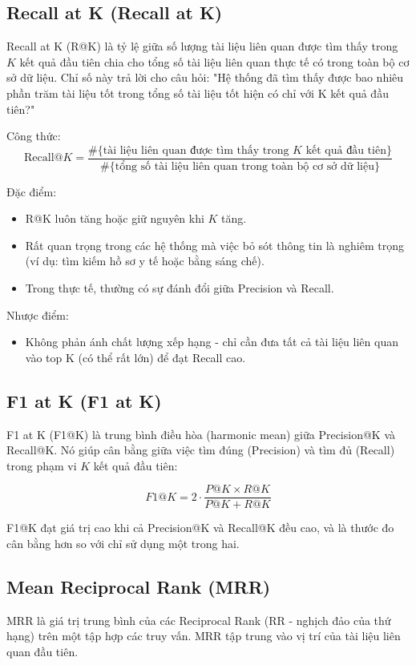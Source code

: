 \documentclass[../BTL.tex]{subfiles}
\begin{document}
\subsection{Recall at K (Recall at K)}
Recall at K (R@K) là tỷ lệ giữa số lượng tài liệu liên quan được tìm thấy trong $K$ kết quả đầu tiên chia cho tổng số tài liệu liên quan thực tế có trong toàn bộ cơ sở dữ liệu. Chỉ số này trả lời cho câu hỏi: "Hệ thống đã tìm thấy được bao nhiêu phần trăm tài liệu tốt trong tổng số tài liệu tốt hiện có chỉ với K kết quả đầu tiên?"

Công thức:
$$
\text{Recall}@K = \frac{\#\{\text{tài liệu liên quan được tìm thấy trong } K \text{ kết quả đầu tiên}\}}{\#\{\text{tổng số tài liệu liên quan trong toàn bộ cơ sở dữ liệu}\}}
$$

Đặc điểm:
\begin{itemize}
    \item R@K luôn tăng hoặc giữ nguyên khi $K$ tăng.
    
    \item Rất quan trọng trong các hệ thống mà việc bỏ sót thông tin là nghiêm trọng (ví dụ: tìm kiếm hồ sơ y tế hoặc bằng sáng chế).
    
    \item Trong thực tế, thường có sự đánh đổi giữa Precision và Recall.
\end{itemize}

Nhược điểm:
\begin{itemize}
    \item Không phản ánh chất lượng xếp hạng - chỉ cần đưa tất cả tài liệu liên quan vào top K (có thể rất lớn) để đạt Recall cao.
\end{itemize}

\subsection{F1 at K (F1 at K)}
F1 at K (F1@K) là trung bình điều hòa (harmonic mean) giữa Precision@K và Recall@K. Nó giúp cân bằng giữa việc tìm đúng (Precision) và tìm đủ (Recall) trong phạm vi $K$ kết quả đầu tiên:

$$
F1@K = 2 \cdot \frac{P@K \times R@K}{P@K + R@K}
$$

F1@K đạt giá trị cao khi cả Precision@K và Recall@K đều cao, và là thước đo cân bằng hơn so với chỉ sử dụng một trong hai.

\subsection{Mean Reciprocal Rank (MRR)}
MRR là giá trị trung bình của các Reciprocal Rank (RR - nghịch đảo của thứ hạng) trên một tập hợp các truy vấn. MRR tập trung vào vị trí của tài liệu liên quan đầu tiên.
\end{document}
